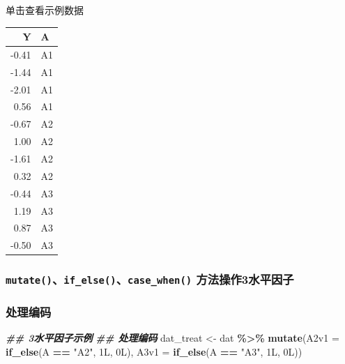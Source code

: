 \documentclass[
]{book}
\newenvironment{Shaded}{\begin{snugshade}}{\end{snugshade}}
\newcommand{\AttributeTok}[1]{\textcolor[rgb]{0.13,0.29,0.53}{#1}}
\newcommand{\DocumentationTok}[1]{\textcolor[rgb]{0.56,0.35,0.01}{\textbf{\textit{#1}}}}
\newcommand{\FunctionTok}[1]{\textcolor[rgb]{0.13,0.29,0.53}{\textbf{#1}}}
\newcommand{\NormalTok}[1]{#1}
\newcommand{\OtherTok}[1]{\textcolor[rgb]{0.56,0.35,0.01}{#1}}
\newcommand{\SpecialCharTok}[1]{\textcolor[rgb]{0.81,0.36,0.00}{\textbf{#1}}}
\newcommand{\StringTok}[1]{\textcolor[rgb]{0.31,0.60,0.02}{#1}}
\begin{document}
单击查看示例数据

\begin{table}
\centering
\begin{tabular}{r|l}
\hline
Y & A\\
\hline
-0.41 & A1\\
\hline
-1.44 & A1\\
\hline
-2.01 & A1\\
\hline
0.56 & A1\\
\hline
-0.67 & A2\\
\hline
1.00 & A2\\
\hline
-1.61 & A2\\
\hline
0.32 & A2\\
\hline
-0.44 & A3\\
\hline
1.19 & A3\\
\hline
0.87 & A3\\
\hline
-0.50 & A3\\
\hline
\end{tabular}
\end{table}

\hypertarget{mutateif_elsecase_when-ux65b9ux6cd5ux64cdux4f5c3ux6c34ux5e73ux56e0ux5b50}{%
\subsubsection{\texorpdfstring{\texttt{mutate()}、\texttt{if\_else()}、\texttt{case\_when()} 方法操作3水平因子}{mutate()、if\_else()、case\_when() 方法操作3水平因子}}\label{mutateif_elsecase_when-ux65b9ux6cd5ux64cdux4f5c3ux6c34ux5e73ux56e0ux5b50}}

\hypertarget{ux5904ux7406ux7f16ux7801}{%
\subsubsection{处理编码}\label{ux5904ux7406ux7f16ux7801}}

\begin{Shaded}
\begin{Highlighting}[]
  \DocumentationTok{\#\# 3水平因子示例}
  \DocumentationTok{\#\# 处理编码}
\NormalTok{  dat\_treat }\OtherTok{\textless{}{-}}\NormalTok{ dat }\SpecialCharTok{\%\textgreater{}\%}
    \FunctionTok{mutate}\NormalTok{(}\AttributeTok{A2v1 =} \FunctionTok{if\_else}\NormalTok{(A }\SpecialCharTok{==} \StringTok{"A2"}\NormalTok{, 1L, 0L),}
       \AttributeTok{A3v1 =} \FunctionTok{if\_else}\NormalTok{(A }\SpecialCharTok{==} \StringTok{"A3"}\NormalTok{, 1L, 0L))}
\end{Highlighting}
\end{Shaded}
\end{document}
